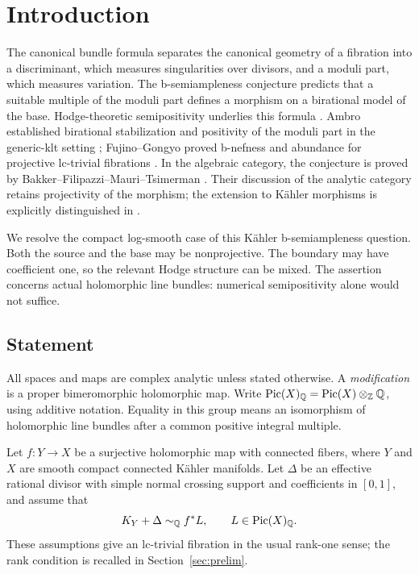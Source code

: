 \section{Introduction}\label{sec:intro}

The canonical bundle formula separates the canonical geometry of a
fibration into a discriminant, which measures singularities over divisors,
and a moduli part, which measures variation.
The b-semiampleness conjecture predicts that a suitable multiple of the
moduli part defines a morphism on a birational model of the base.
Hodge-theoretic semipositivity underlies this formula
\cite{Kawamata81}. Ambro established birational stabilization and
positivity of the moduli part in the generic-klt setting
\cite{Ambro04,Ambro05}; Fujino--Gongyo proved b-nefness and abundance
for projective lc-trivial fibrations \cite{FujinoGongyo14}.
In the algebraic category, the conjecture is proved by
Bakker--Filipazzi--Mauri--Tsimerman \cite[Theorem~1.5]{BFMT25}.
Their discussion of the analytic category retains projectivity of the
morphism; the extension to K\"ahler morphisms is explicitly distinguished
in \cite[Remarks~6.31 and~7.5]{BFMT25}.

We resolve the compact log-smooth case of this K\"ahler b-semiampleness
question. Both the source and the base may be nonprojective.
The boundary may have coefficient one, so the relevant Hodge structure
can be mixed. The assertion concerns actual holomorphic line bundles:
numerical semipositivity alone would not suffice.

\subsection{Statement}

All spaces and maps are complex analytic unless stated otherwise.
A \emph{modification} is a proper bimeromorphic holomorphic map.
Write \(\operatorname{Pic}(X)_{\mathbb Q}=\operatorname{Pic}(X)\otimes_{\mathbb Z}\mathbb Q\), using additive notation.
Equality in this group means an isomorphism of holomorphic line bundles
after a common positive integral multiple.

Let \(f:Y\to X\) be a surjective holomorphic map with connected fibers,
where \(Y\) and \(X\) are smooth compact connected K\"ahler manifolds.
Let \(\Delta\) be an effective rational divisor with simple normal
crossing support and coefficients in \([0,1]\), and assume that
\begin{equation}\label{eq:adjoint}
 K_Y+\Delta\sim_{\mathbb Q}f^*L,\qquad L\in\operatorname{Pic}(X)_{\mathbb Q}.
\end{equation}
These assumptions give an lc-trivial fibration in the usual rank-one
sense; the rank condition is recalled in
Section~\ref{sec:prelim}.

